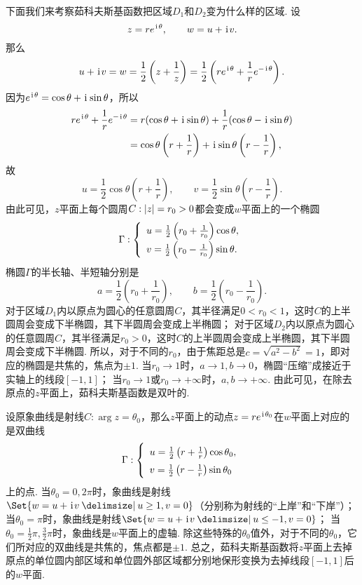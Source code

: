 下面我们来考察茹科夫斯基函数把区域\(D_1\)和\(D_2\)变为什么样的区域.
设\[
z = r e^{\kern1pt\mathrm{i}\kern1pt\theta}, \qquad
w = u + \kern1pt\mathrm{i}\kern1pt v.
\]那么\[
u + \kern1pt\mathrm{i}\kern1pt v = w
= \frac{1}{2} \left(z + \frac{1}{z}\right)
= \frac{1}{2} \left( r e^{\kern1pt\mathrm{i}\kern1pt\theta} + \frac{1}{r} e^{-\kern1pt\mathrm{i}\kern1pt\theta} \right).
\]因为\(e^{\kern1pt\mathrm{i}\kern1pt\theta} = \cos\theta + \kern1pt\mathrm{i}\kern1pt \sin\theta\)，所以\begin{align*}
r e^{\kern1pt\mathrm{i}\kern1pt\theta} + \frac{1}{r} e^{-\kern1pt\mathrm{i}\kern1pt\theta}
&= r (\cos\theta + \kern1pt\mathrm{i}\kern1pt \sin\theta)
+ \frac{1}{r} (\cos\theta - \kern1pt\mathrm{i}\kern1pt \sin\theta) \\
&= \cos\theta \left( r + \frac{1}{r} \right)
+ \kern1pt\mathrm{i}\kern1pt \sin\theta \left( r - \frac{1}{r} \right),
\end{align*}故\[
u = \frac{1}{2} \cos\theta \left( r + \frac{1}{r} \right),
\qquad
v = \frac{1}{2} \sin\theta \left( r - \frac{1}{r} \right).
\]由此可见，\(z\)平面上每个圆周\(C: \abs{z} = r_0 > 0\)都会变成\(w\)平面上的一个椭圆\[
\Gamma: \left\{ \def\arraystretch{1.5} \begin{array}{l}
u = \frac{1}{2} \left( r_0 + \frac{1}{r_0} \right) \cos\theta, \\
v = \frac{1}{2} \left( r_0 - \frac{1}{r_0} \right) \sin\theta.
\end{array} \right.
\]椭圆\(\Gamma\)的半长轴、半短轴分别是\[
a = \frac{1}{2} \left( r_0 + \frac{1}{r_0} \right),
\qquad
b = \frac{1}{2} \left( r_0 - \frac{1}{r_0} \right).
\]
对于区域\(D_1\)内以原点为圆心的任意圆周\(C\)，其半径满足\(0 < r_0 < 1\)，这时\(C\)的上半圆周会变成下半椭圆，其下半圆周会变成上半椭圆；
对于区域\(D_2\)内以原点为圆心的任意圆周\(C\)，其半径满足\(r_0 > 0\)，这时\(C\)的上半圆周会变成上半椭圆，其下半圆周会变成下半椭圆.
所以，对于不同的\(r_0\)，由于焦距总是\(c = \sqrt{a^2-b^2} = 1\)，即对应的椭圆是共焦的，焦点为\(\pm1\).
当\(r_0\to1\)时，\(a\to1,b\to0\)，椭圆“压缩”成接近于实轴上的线段\([-1,1]\)；
当\(r_0\to1\)或\(r_0\to+\infty\)时，\(a,b\to+\infty\).
由此可见，在除去原点的\(z\)平面上，茹科夫斯基函数是双叶的.

设原象曲线是射线\(C: \arg z = \theta_0\)，那么\(z\)平面上的动点\(z = r e^{\kern1pt\mathrm{i}\kern1pt\theta_0}\)在\(w\)平面上对应的是双曲线\[
\Gamma: \left\{ \def\arraystretch{1.5} \begin{array}{l}
u = \frac{1}{2} \left( r + \frac{1}{r} \right) \cos\theta_0, \\
v = \frac{1}{2} \left( r - \frac{1}{r} \right) \sin\theta_0
\end{array} \right.
\]上的点.
当\(\theta_0=0,2\pi\)时，象曲线是射线\(\Set{ w = u + \iu v \given u\geq1, v=0 }\)（分别称为射线的“上岸”和“下岸”）；
当\(\theta_0=\pi\)时，象曲线是射线\(\Set{ w = u + \iu v \given u\leq-1, v=0 }\)；
当\(\theta_0=\frac{1}{2}\pi,\frac{3}{2}\pi\)时，象曲线是\(w\)平面上的虚轴.
除这些特殊的\(\theta_0\)值外，对于不同的\(\theta_0\)，它们所对应的双曲线是共焦的，焦点都是\(\pm1\).
总之，茹科夫斯基函数将\(z\)平面上去掉原点的单位圆内部区域和单位圆外部区域都分别地保形变换为去掉线段\([-1,1]\)后的\(w\)平面.

